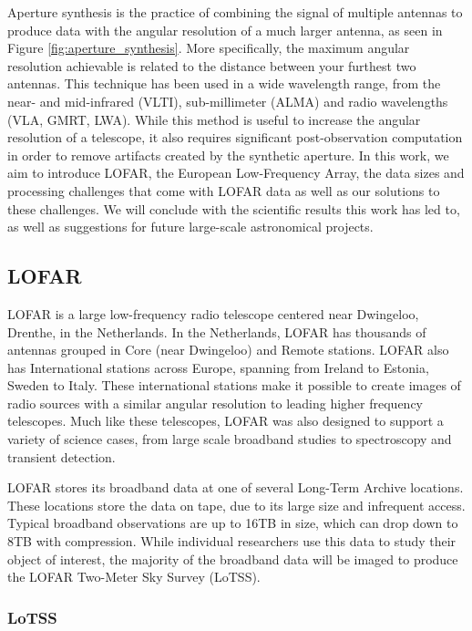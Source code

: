 Aperture synthesis is the practice of combining the signal of multiple antennas to produce data with the angular resolution of a much larger antenna, as seen in Figure \ref{fig:aperture_synthesis}. More specifically, the maximum angular resolution achievable is related to the distance between your furthest two antennas. This technique has been used in a wide wavelength range, from the near- and mid-infrared (VLTI), sub-millimeter (ALMA) and radio wavelengths (VLA, GMRT, LWA). While this method is useful to increase the angular resolution of a telescope, it also requires significant post-observation computation in order to remove artifacts created by the synthetic aperture. In this work, we aim to introduce LOFAR, the European Low-Frequency Array, the data sizes and processing challenges that come with LOFAR data as well as our solutions to these challenges. We will conclude with the scientific results this work has led to, as well as suggestions for future large-scale astronomical projects.

\subsection{LOFAR}

LOFAR is a large low-frequency radio telescope centered near Dwingeloo, Drenthe, in the Netherlands. In the Netherlands, LOFAR has thousands of antennas grouped in Core (near Dwingeloo) and Remote stations. LOFAR also has International stations across Europe, spanning from Ireland to Estonia, Sweden to Italy. These international stations make it possible to create images of radio sources with a similar angular resolution to leading higher frequency telescopes. Much like these telescopes, LOFAR was also designed to support a variety of science cases, from large scale broadband studies to spectroscopy and transient detection. 

LOFAR stores its broadband data at one of several Long-Term Archive locations. These locations store the data on tape, due to its large size and infrequent access. Typical broadband observations are up to 16TB in size, which can drop down to 8TB with compression. While individual researchers use this data to study their object of interest, the majority of the broadband data will be imaged to produce the LOFAR Two-Meter Sky Survey (LoTSS). 

\subsubsection{LoTSS} 

